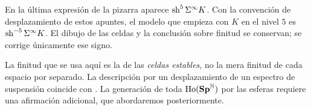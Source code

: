 \begin{nota}
En la última expresión de la pizarra aparece $\operatorname{sh}^5\Sigma^\infty K$. Con la convención de desplazamiento de estos apuntes, el modelo que empieza con $K$ en el nivel $5$ es $\operatorname{sh}^{-5}\Sigma^\infty K$. El dibujo de las celdas y la conclusión sobre finitud se conservan; se corrige únicamente ese signo.
\end{nota}

\begin{nota}
La finitud que se usa aquí es la de las \emph{celdas estables}, no la mera finitud de cada espacio por separado. La descripción por un desplazamiento de un espectro de suspensión coincide con \cite[sección~4.2.2]{malkiewich}. La generación de toda $\operatorname{Ho}(\mathbf{Sp}^{\mathbb N})$ por las esferas requiere una afirmación adicional, que abordaremos posteriormente.
\end{nota}
